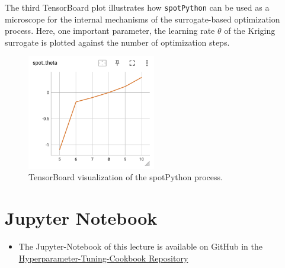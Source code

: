 \documentclass[
  letterpaper,
  DIV=11,
  numbers=noendperiod]{scrreprt}
\providecommand{\tightlist}{%
  \setlength{\itemsep}{0pt}\setlength{\parskip}{0pt}}\usepackage{longtable,booktabs,array}
\begin{document}
The third TensorBoard plot illustrates how \texttt{spotPython} can be
used as a microscope for the internal mechanisms of the surrogate-based
optimization process. Here, one important parameter, the learning rate
\(\theta\) of the Kriging surrogate is plotted against the number of
optimization steps.

\begin{figure}[H]

{\centering \includegraphics[width=0.5\textwidth,height=\textheight]{figures_static/01_tensorboard_03.png}

}

\caption{TensorBoard visualization of the spotPython process.}

\end{figure}%

\section{Jupyter Notebook}\label{jupyter-notebook-6}

\begin{tcolorbox}[enhanced jigsaw, coltitle=black, bottomrule=.15mm, breakable, toprule=.15mm, colframe=quarto-callout-note-color-frame, title=\textcolor{quarto-callout-note-color}{\faInfo}\hspace{0.5em}{Note}, colbacktitle=quarto-callout-note-color!10!white, opacityback=0, left=2mm, leftrule=.75mm, colback=white, rightrule=.15mm, bottomtitle=1mm, toptitle=1mm, titlerule=0mm, arc=.35mm, opacitybacktitle=0.6]

\begin{itemize}
\tightlist
\item
  The Jupyter-Notebook of this lecture is available on GitHub in the
  \href{https://github.com/sequential-parameter-optimization/Hyperparameter-Tuning-Cookbook/blob/main/007_num_spot_intro.ipynb}{Hyperparameter-Tuning-Cookbook
  Repository}
\end{itemize}

\end{tcolorbox}
\end{document}

